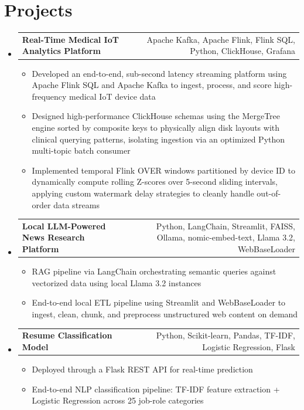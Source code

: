 \documentclass[letterpaper,10pt]{article}
\makeatletter
\newcommand{\resumeSingleHeading}[2]{
  \vspace{1pt}\item
    \begin{tabular*}{0.985\textwidth}{l@{\extracolsep{\fill}}r}
      \textbf{#1} & \small#2 \\
    \end{tabular*}\vspace{2pt}
}
\newcommand{\resumeItem}[1]{\item\small{#1}}
\newcommand{\resumeSubHeadingListStart}{\begin{itemize}[leftmargin=0.0in, label={}]}
\newcommand{\resumeSubHeadingListEnd}{\end{itemize}\vspace{-2pt}}
\newcommand{\resumeItemListStart}{\begin{itemize}[leftmargin=0.17in]}
\newcommand{\resumeItemListEnd}{\end{itemize}\vspace{2pt}}
\makeatother
\begin{document}
\section{Projects}
  \resumeSubHeadingListStart
    \resumeSingleHeading
      {Real-Time Medical IoT Analytics Platform}{Apache Kafka, Apache Flink, Flink SQL, Python, ClickHouse, Grafana}
      \resumeItemListStart
        \resumeItem{Developed an end-to-end, sub-second latency streaming platform using Apache Flink SQL and Apache Kafka to ingest, process, and score high-frequency medical IoT device data}
        \resumeItem{Designed high-performance ClickHouse schemas using the MergeTree engine sorted by composite keys to physically align disk layouts with clinical querying patterns, isolating ingestion via an optimized Python multi-topic batch consumer}
        \resumeItem{Implemented temporal Flink OVER windows partitioned by device ID to dynamically compute rolling Z-scores over 5-second sliding intervals, applying custom watermark delay strategies to cleanly handle out-of-order data streams}
      \resumeItemListEnd
    \resumeSingleHeading
      {Local LLM-Powered News Research Platform}{Python, LangChain, Streamlit, FAISS, Ollama, nomic-embed-text, Llama 3.2, WebBaseLoader}
      \resumeItemListStart
        \resumeItem{RAG pipeline via LangChain orchestrating semantic queries against vectorized data using local Llama 3.2 instances}
        \resumeItem{End-to-end local ETL pipeline using Streamlit and WebBaseLoader to ingest, clean, chunk, and preprocess unstructured web content on demand}
      \resumeItemListEnd
    \resumeSingleHeading
      {Resume Classification Model}{Python, Scikit-learn, Pandas, TF-IDF, Logistic Regression, Flask}
      \resumeItemListStart
        \resumeItem{Deployed through a Flask REST API for real-time prediction}
        \resumeItem{End-to-end NLP classification pipeline: TF-IDF feature extraction + Logistic Regression across 25 job-role categories}
      \resumeItemListEnd
  \resumeSubHeadingListEnd
\end{document}
